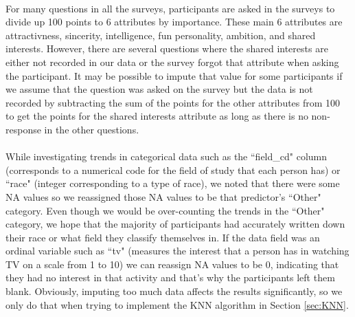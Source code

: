 \documentclass{article}
\begin{document}
\null\\
For many questions in all the surveys, participants are asked in the surveys to divide up 100 points to 6 attributes by importance.  These main 6 attributes are attractivness, sincerity, intelligence, fun personality, ambition, and shared interests.  However, there are several questions where the shared interests are either not recorded in our data or the survey forgot that attribute when asking the participant.  It may be possible to impute that value for some participants if we assume that the question was asked on the survey but the data is not recorded by subtracting the sum of the points for the other attributes from 100 to get the points for the shared interests attribute as long as there is no non-response in the other questions.\\
\null\\
While investigating trends in categorical data such as the ``field\_cd" column (corresponds to a numerical code for the field of study that each person has) or ``race" (integer corresponding to a type of race), we noted that there were some NA values so we reassigned those NA values to be that predictor's ``Other" category.  Even though we would be over-counting the trends in the ``Other" category, we hope that the majority of participants had accurately written down their race or what field they classify themselves in.  If the data field was an ordinal variable such as ``tv" (measures the interest that a person has in watching TV on a scale from 1 to 10) we can reassign NA values to be 0, indicating that they had no interest in that activity and that's why the participants left them blank.  Obviously, imputing too much data affects the results significantly, so we only do that when trying to implement the KNN algorithm in Section \ref{sec:KNN}.\\
\end{document}
